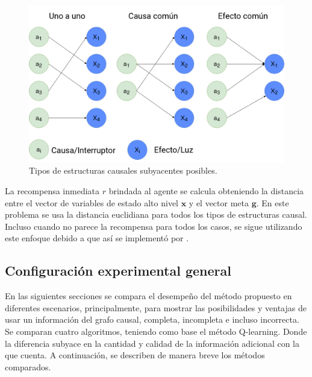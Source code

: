 \begin{figure}[H]
    \centering
    \includegraphics[scale=0.2]{Chapter5/Figs/switches_struct.png}
    \caption{Tipos de estructuras causales subyacentes posibles.}
    \label{fig:struct}
\end{figure}
La recompensa inmediata $r$ brindada al agente se calcula obteniendo la distancia entre el vector de variables de estado alto nivel $\mathbf{x}$ y el vector meta $\mathbf{g}$. En este problema se usa la distancia euclidiana para todos los tipos de estructuras causal. Incluso cuando
no parece la recompensa para todos los casos, se sigue utilizando
este enfoque debido a que así se implementó por \citet{nair2019causal}.


\subsection{Configuración experimental general}

En las siguientes secciones se compara el desempeño 
del método propuesto en diferentes escenarios, principalmente, para mostrar 
las posibilidades y ventajas de usar un información del grafo causal, completa, incompleta e incluso incorrecta. 
Se comparan cuatro algoritmos, teniendo como base
el método Q-learning. Donde la diferencia subyace en la cantidad y calidad de la información adicional con la que cuenta. A continuación, se describen de manera breve los métodos
comparados.


